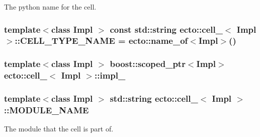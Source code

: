 The python name for the cell. 

\hypertarget{structecto_1_1cell___a26e158738e4e4c8f0ddb64efce30d8d3}{
\subsubsection[{C\-E\-L\-L\-\_\-\-T\-Y\-P\-E\-\_\-\-N\-A\-M\-E}]{\setlength{\rightskip}{0pt plus 5cm}template$<$class Impl $>$ const std\-::string {\bf ecto\-::cell\-\_\-}$<$ Impl $>$\-::C\-E\-L\-L\-\_\-\-T\-Y\-P\-E\-\_\-\-N\-A\-M\-E = {\bf ecto\-::name\-\_\-of}$<$Impl$>$()\hspace{0.3cm}{\ttfamily [static]}}}\label{structecto_1_1cell___a26e158738e4e4c8f0ddb64efce30d8d3}
\hypertarget{structecto_1_1cell___a2984b78c1ed24aca6ee427502bd6e8c4}{
\subsubsection[{impl\-\_\-}]{\setlength{\rightskip}{0pt plus 5cm}template$<$class Impl $>$ boost\-::scoped\-\_\-ptr$<$Impl$>$ {\bf ecto\-::cell\-\_\-}$<$ Impl $>$\-::impl\-\_\-\hspace{0.3cm}{\ttfamily [private]}}}\label{structecto_1_1cell___a2984b78c1ed24aca6ee427502bd6e8c4}
\hypertarget{structecto_1_1cell___ab81cf6649132223f620b739a57db04db}{
\subsubsection[{M\-O\-D\-U\-L\-E\-\_\-\-N\-A\-M\-E}]{\setlength{\rightskip}{0pt plus 5cm}template$<$class Impl $>$ std\-::string {\bf ecto\-::cell\-\_\-}$<$ Impl $>$\-::M\-O\-D\-U\-L\-E\-\_\-\-N\-A\-M\-E\hspace{0.3cm}{\ttfamily [static]}}}\label{structecto_1_1cell___ab81cf6649132223f620b739a57db04db}


The module that the cell is part of. 

